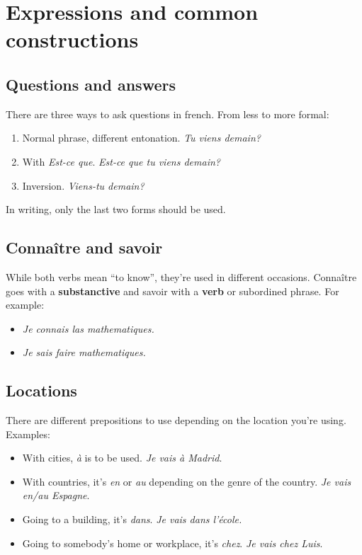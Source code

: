 \documentclass{epflnotes}
\begin{document}
\section{Expressions and common constructions}

\subsection{Questions and answers}

There are three ways to ask questions in french. From less to more formal:

\begin{enumerate}
\item Normal phrase, different entonation. \textit{Tu viens demain?}
\item With \textit{Est-ce que}. \textit{Est-ce que tu viens demain?}
\item Inversion. \textit{Viens-tu demain?}
\end{enumerate}

In writing, only the last two forms should be used.

\subsection{Connaître and savoir}

While both verbs mean ``to know'', they're used in different occasions. Connaître goes with a \textbf{substanctive} and savoir with a \textbf{verb} or subordined phrase. For example:

\begin{itemize}
\item \textit{Je connais las mathematiques.}
\item \textit{Je sais faire mathematiques.}
\end{itemize}

\subsection{Locations}

There are different prepositions to use depending on the location you're using. Examples:

\begin{itemize}
\item With cities, \textit{à} is to be used. \textit{Je vais à Madrid}.
\item With countries, it's \textit{en} or \textit{au} depending on the genre of the country. \textit{Je vais en/au Espagne}.
\item Going to a building, it's \textit{dans}. \textit{Je vais dans l'école.}
\item Going to somebody's home or workplace, it's \textit{chez}. \textit{Je vais chez Luis}.
\end{itemize}
\end{document}
